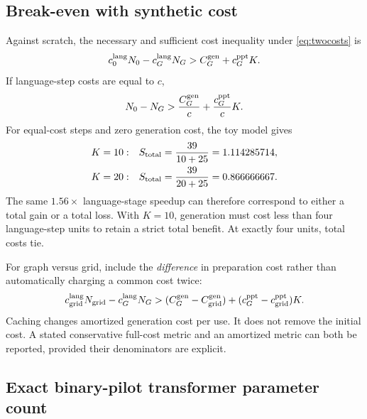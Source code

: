 \subsection{Break-even with synthetic cost}

Against scratch, the necessary and sufficient cost inequality under
\eqref{eq:twocosts} is
\begin{equation}
 c_0^{\rm lang}N_0-c_G^{\rm lang}N_G
 >C_G^{\rm gen}+c_G^{\rm ppt}K.
 \label{eq:breakeven}
\end{equation}
If language-step costs are equal to $c$,
\begin{equation}
 N_0-N_G>
 \frac{C_G^{\rm gen}}c+\frac{c_G^{\rm ppt}}cK.
\end{equation}
For equal-cost steps and zero generation cost, the toy model gives
\begin{align}
 K=10:&\quad S_{\rm total}=\frac{39}{10+25}
                    =1.114285714,\\
 K=20:&\quad S_{\rm total}=\frac{39}{20+25}
                    =0.866666667.
\end{align}
The same $1.56\times$ language-stage speedup can therefore correspond to
either a total gain or a total loss. With $K=10$, generation must cost
less than four language-step units to retain a strict total benefit.
At exactly four units, total costs tie.

For graph versus grid, include the \emph{difference} in preparation
cost rather than automatically charging a common cost twice:
\begin{equation}
 c_{\rm grid}^{\rm lang}N_{\rm grid}
       -c_G^{\rm lang}N_G
 >
 (C_G^{\rm gen}-C_{\rm grid}^{\rm gen})
 +(c_G^{\rm ppt}-c_{\rm grid}^{\rm ppt})K.
\end{equation}
Caching changes amortized generation cost per use. It does not remove
the initial cost. A stated conservative full-cost metric and an amortized
metric can both be reported, provided their denominators are explicit.

\subsection{Exact binary-pilot transformer parameter count}

